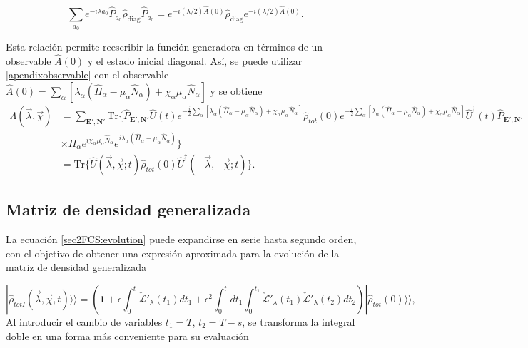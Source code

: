 \begin{appendixs}
\begin{equation}
    \sum_{a_0} e^{-i\lambda a_0} \hat{P}_{a_0} \hat{\rho}_{\text{diag}} \hat{P}_{a_0} 
    = e^{-i(\lambda/2)\hat{A}(0)} \hat{\rho}_{\text{diag}} e^{-i(\lambda/2)\hat{A}(0)}.
    \label{apendixobservable}
\end{equation}

Esta relación permite reescribir la función generadora en términos de un observable $\hat{A}(0)$ y el estado inicial diagonal. Así, se puede utilizar \ref{apendixobservable} con el observable $\hat{A}(0) = \sum_{\alpha}[\lambda_{\alpha}(\hat{H}_{\alpha}-\mu_{\alpha}\hat{N}_{\alpha}) + \chi_{\alpha}\mu_{\alpha}\hat{N}_{\alpha}] $ y se obtiene 
\begin{align*}
    \Lambda(\vec{\lambda},\vec{\chi}) & = \sum_{\textbf{E}',\textbf{N}'}\text{Tr}\{ \hat{P}_{\textbf{E}',\textbf{N}'} \hat{U}(t) e^{-\frac{i}{2}\sum_{\alpha}[\lambda_{\alpha}(\hat{H}_{\alpha} - \mu_{\alpha}\hat{N}_{\alpha}) + \chi_{\alpha}\mu_{\alpha}\hat{N}_{\alpha}  ]}  \hat{\rho}_{tot}(0) e^{-\frac{i}{2}\sum_{\alpha}[\lambda_{\alpha}(\hat{H}_{\alpha} - \mu_{\alpha}\hat{N}_{\alpha}) + \chi_{\alpha}\mu_{\alpha}\hat{N}_{\alpha} ] }\hat{U}^{\dagger}(t) \hat{P}_{\textbf{E}',\textbf{N}'}  \\
    & \times \Pi_{\alpha}e^{i\chi_{\alpha}\mu_{\alpha}\hat{N}_{\alpha}}e^{i\lambda_{\alpha}(\hat{H}_{\alpha} -\mu_{\alpha}\hat{N}_{\alpha})} \} \\
    & = \text{Tr}\{ \hat{U}(\vec{\lambda},\vec{\chi};t)\hat{\rho}_{tot}(0)\hat{U}^{\dagger}(-\vec{\lambda},-\vec{\chi};t)  \}.
\end{align*}

\newpage 

    \subsection{Matriz de densidad generalizada}

La ecuación \ref{sec2FCS:evolution} puede expandirse en serie hasta segundo orden, con el objetivo de obtener una expresión aproximada para la evolución de la matriz de densidad generalizada

    \begin{equation*}
        |\hat{\rho}_{totI}(\vec{\lambda},\vec{\chi},t)\rangle \rangle  = \left( \textbf{1} + \epsilon \int_{0}^{t}\check{\mathcal{L}}'_{\lambda}(t_{1})dt_{1} + \epsilon^{2}\int_{0}^{t}dt_{1}\int_{0}^{t_{1}}\check{\mathcal{L}}'_{\lambda}(t_{1})\check{\mathcal{L}}'_{\lambda}(t_{2})dt_{2} \right) |\hat{\rho}_{tot}(0)\rangle \rangle, 
    \end{equation*}
Al introducir el cambio de variables \( t_1 = T \), \( t_2 = T - s \), se transforma la integral doble en una forma más conveniente para su evaluación


\end{appendixs}
